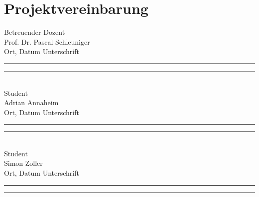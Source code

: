 \section{Projektvereinbarung}

Betreuender Dozent \bigskip \\
Prof. Dr. Pascal Schleuniger \bigskip \\
Ort, Datum\hspace{3cm} Unterschrift \bigskip \\
\rule{4cm}{0.4pt} \hspace{0.9cm} \rule{4cm}{0.4pt}\bigskip \\

Student \bigskip \\
Adrian Annaheim \bigskip \\
Ort, Datum\hspace{3cm} Unterschrift \bigskip \\
\rule{4cm}{0.4pt} \hspace{0.9cm} \rule{4cm}{0.4pt}\bigskip \\

Student \bigskip \\
Simon Zoller \bigskip \\
Ort, Datum\hspace{3cm} Unterschrift \bigskip \\
\rule{4cm}{0.4pt} \hspace{0.9cm} \rule{4cm}{0.4pt}\bigskip \\


